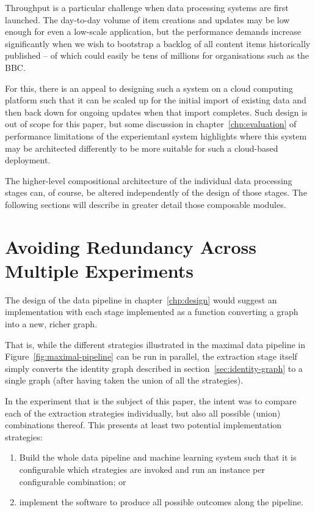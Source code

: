 Throughput is a particular challenge when data processing systems
are first launched. The day-to-day volume of item creations and
updates may be low enough for even a low-scale application, but the
performance demands increase significantly when we wish to bootstrap
a backlog of all content items historically published -- of which
could easily be tens of millions for organisations such as the BBC.

For this, there is an
appeal to designing such a system on a cloud computing platform such
that it can be scaled up for the initial import of existing data and
then back down for ongoing updates when that import completes. Such
design is out of scope for this paper, but some discussion in chapter~\ref{chp:evaluation}
of performance limitations of the experiemtanl system highlights where
this system may be architected differently to be more suitable for
such a cloud-based deployment.

The higher-level compositional architecture of the individual
data processing stages can, of course, be altered independently of
the design of those stages. The following sections will describe in
greater detail those composable modules.

\section{Avoiding Redundancy Across Multiple Experiments}

The design of the data pipeline in chapter~\ref{chp:design} would
suggest an implementation with each stage implemented as a function
converting a graph into a new, richer graph.

That is, while the different strategies illustrated in the maximal
data pipeline in Figure~\ref{fig:maximal-pipeline} can be run in
parallel, the extraction stage itself simply converts the identity
graph described in section~\ref{sec:identity-graph} to a single graph
(after having taken the union of all the strategies).

In the experiment that is the subject of this paper, the intent was
to compare each of the extraction strategies individually, but also
all possible (union) combinations thereof. This presents at least
two potential implementation strategies:

\begin{enumerate}
\item Build the whole data pipeline and machine learning system such
  that it is configurable which strategies are invoked and run an
  instance per configurable combination; or
\item implement the software to produce all possible outcomes along
  the pipeline.
\end{enumerate}

